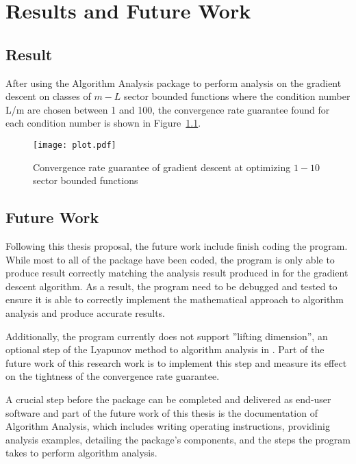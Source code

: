 \chapter{Results and Future Work}\label{chapter:result}
\section{Result}
After using the Algorithm Analysis package to perform analysis on the gradient descent on classes of $m-L$ sector bounded functions where the condition number L/m are chosen between 1 and 100, the convergence rate guarantee found for each condition number is shown in Figure~\ref{plot_result}. 
\begin{figure}[h]
    \centering
    \texttt{[image: plot.pdf]}
    \caption{Convergence rate guarantee of gradient descent at optimizing $1-10$ sector bounded functions}
    \label{plot_result}
\end{figure}

\section{Future Work}
Following this thesis proposal, the future work include finish coding the program. While most to all of the package have been coded, the program is only able to produce result correctly matching the analysis result produced in \cite{tutorial} for the gradient descent algorithm. As a result, the program need to be debugged and tested to ensure it is able to correctly implement the mathematical approach to algorithm analysis and produce accurate results.

Additionally, the program currently does not support ''lifting dimension'', an optional step of the Lyapunov method to algorithm analysis in \cite{tutorial}. Part of the future work of this research work is to implement this step and measure its effect on the tightness of the convergence rate guarantee.

A crucial step before the package can be completed and delivered as end-user software and part of the future work of this thesis is the documentation of Algorithm Analysis, which includes writing operating instructions, providinig analysis examples, detailing the package's components, and the steps the program takes to perform algorithm analysis.